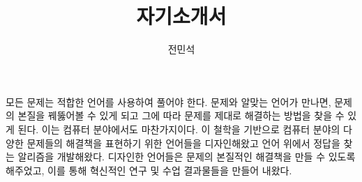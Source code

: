 \documentclass[11pt]{article}
\begin{document}
\title{자기소개서}

\author{전민석}



\newcommand{\DisjunctiveModel}{\textsc{Disjunctive Model}}
\newcommand{\FeatureLanguage}{\textsc{Feature Language}}
\newcommand{\GDL}{\textsc{Graph Description Language}}
\newcommand{\PLXGL}{\textsc{PL4XGL}}


\newcommand{\AbstractRelativeWritePattern}{\textsc{Abstract Relative Write Pattern}}

\maketitle 
\begin{spacing}{1.125}
모든 문제는 적합한 언어를 사용하여 풀어야 한다.
%
문제와 알맞는 언어가 만나면, 문제의 본질을 꿰뚫어볼 수 있게 되고 그에 따라 문제를 제대로 해결하는 방법을 찾을 수 있게 된다.
%
이는 컴퓨터 분야에서도 마찬가지이다.
%
이 철학을 기반으로 컴퓨터 분야의 다양한 문제들의 해결책을 표현하기 위한 언어들을 디자인해왔고 언어 위에서 정답을 찾는 알리즘을 개발해왔다.
%
디자인한 언어들은 문제의 본질적인 해결책을 만들 수 있도록 해주었고, 이를 통해 혁신적인 연구 및 수업 결과물들을 만들어 내왔다.
%

\end{spacing}




%
\end{document}
